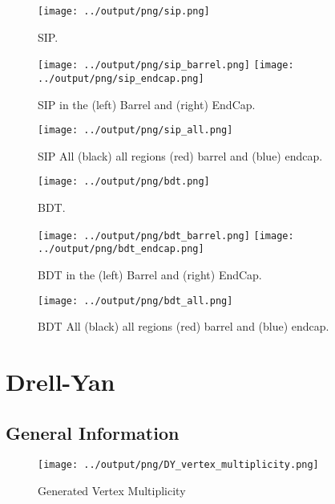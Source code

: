 \documentclass[11pt]{book}
\begin{document}
\begin{figure}[ht]
\centering
\texttt{[image: ../output/png/sip.png]}
\caption{SIP.}
\label{fig:sip}
\end{figure}
\clearpage

\begin{figure}[ht]
\centering
\texttt{[image: ../output/png/sip\_barrel.png]}
\texttt{[image: ../output/png/sip\_endcap.png]}
\caption{SIP in the (left) Barrel and (right) EndCap.}
\label{fig:sip_regions}
\end{figure}

\begin{figure}[ht]
\centering
\texttt{[image: ../output/png/sip\_all.png]}
\caption{SIP All (black) all regions (red) barrel and (blue) endcap.}
\label{fig:sip_all}
\end{figure}

\begin{figure}[ht]
\centering
\texttt{[image: ../output/png/bdt.png]}
\caption{BDT.}
\label{fig:bdt}
\end{figure}
\clearpage

\begin{figure}[ht]
\centering
\texttt{[image: ../output/png/bdt\_barrel.png]}
\texttt{[image: ../output/png/bdt\_endcap.png]}
\caption{BDT in the (left) Barrel and (right) EndCap.}
\label{fig:bdt_regions}
\end{figure}

\begin{figure}[ht]
\centering
\texttt{[image: ../output/png/bdt\_all.png]}
\caption{BDT All (black) all regions (red) barrel and (blue) endcap.}
\label{fig:bdt_all}
\end{figure}

\clearpage

\chapter{Drell-Yan}
\section{General Information}

\begin{figure}[ht]
\centering
\texttt{[image: ../output/png/DY\_vertex\_multiplicity.png]}
\caption{Generated Vertex Multiplicity}
\label{fig:dy_vertex_multiplicity}
\end{figure}
\clearpage
\end{document}
